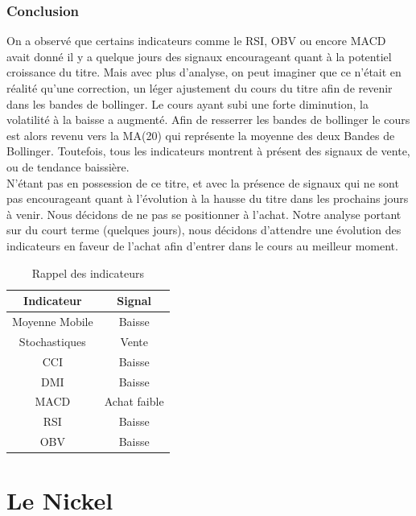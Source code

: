 \documentclass[12pt,a4paper]{article}
\begin{document}
\subsubsection*{Conclusion} 
On a observé que certains indicateurs comme le RSI, OBV ou encore MACD avait donné il y a quelque jours des signaux encourageant quant à la potentiel croissance du titre. 
Mais avec plus d'analyse, on peut imaginer que ce n'était en réalité qu'une correction, un léger ajustement du cours du titre afin de revenir dans les bandes de bollinger. 
Le cours ayant subi une forte diminution, la volatilité à la baisse a augmenté. Afin de resserrer les bandes de bollinger le cours est alors revenu vers la MA(20) qui 
représente la moyenne des deux Bandes de Bollinger. Toutefois, tous les indicateurs montrent à présent des signaux de vente, ou de tendance baissière.\\[11pt]
N'étant pas en possession de ce titre, et avec la présence de signaux qui ne sont pas encourageant quant à l'évolution à la hausse du titre dans les prochains jours à 
venir. Nous décidons de ne pas se positionner à l'achat. Notre analyse portant sur du court terme (quelques jours), nous décidons d'attendre une évolution des indicateurs 
en faveur de l'achat afin d'entrer dans le cours au meilleur moment.
\begin{table}[H]
    \centering
    \caption{Rappel des indicateurs}
    \begin{tabular}{cc}
    \toprule
    Indicateur     & Signal       \\
    \midrule
    Moyenne Mobile & Baisse       \\
    Stochastiques  & Vente        \\
    CCI            & Baisse       \\
    DMI            & Baisse       \\
    MACD           & Achat faible \\
    RSI            & Baisse        \\
    OBV            & Baisse       \\
    \bottomrule
    \end{tabular}
\end{table}
\clearpage
\section{Le Nickel}
\end{document}

